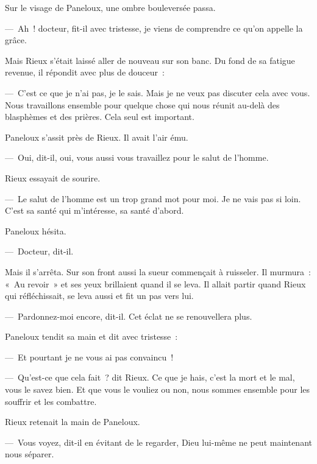\documentclass[french,twoside]{book} %
\begin{document}
Sur le visage de Paneloux, une ombre bouleversée passa.\par
— Ah ! docteur, fit-il avec tristesse, je viens de comprendre ce qu’on appelle la grâce.\par
Mais Rieux s’était laissé aller de nouveau sur son banc. Du fond de sa fatigue revenue, il répondit avec plus de douceur :\par
— C’est ce que je n’ai pas, je le sais. Mais je ne veux pas discuter cela avec vous. Nous travaillons ensemble pour quelque chose qui nous réunit au-delà des blasphèmes et des prières. Cela seul est important.\par
Paneloux s’assit près de Rieux. Il avait l’air ému.\par
— Oui, dit-il, oui, vous aussi vous travaillez pour le salut de l’homme.\par
Rieux essayait de sourire.\par
— Le salut de l’homme est un trop grand mot pour moi. Je ne vais pas si loin. C’est sa santé qui m’intéresse, sa santé d’abord.\par
Paneloux hésita.\par
— Docteur, dit-il.\par
Mais il s’arrêta. Sur son front aussi la sueur commençait à ruisseler. Il murmura : « Au revoir » et ses yeux brillaient quand il se leva. Il allait partir quand Rieux qui réfléchissait, se leva aussi et fit un pas vers lui.\par
— Pardonnez-moi encore, dit-il. Cet éclat ne se renouvellera plus.\par
Paneloux tendit sa main et dit avec tristesse :\par
— Et pourtant je ne vous ai pas convaincu !\par
— Qu’est-ce que cela fait ? dit Rieux. Ce que je hais, c’est la mort et le mal, vous le savez bien. Et que vous le vouliez ou non, nous sommes ensemble pour les souffrir et les combattre.\par
Rieux retenait la main de Paneloux.\par
— Vous voyez, dit-il en évitant de le regarder, Dieu lui-même ne peut maintenant nous séparer.
\end{document}
